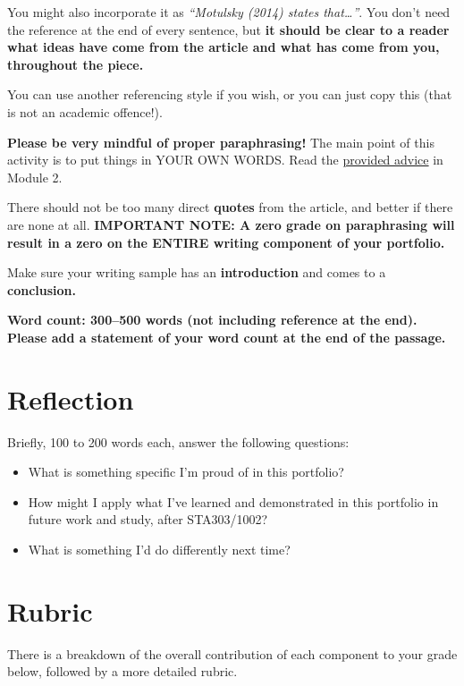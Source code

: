 \documentclass[
  openany]{book}
\begin{document}
You might also incorporate it as \emph{``Motulsky (2014) states that\ldots{}''}. You don't need the reference at the end of every sentence, but \textbf{it should be clear to a reader what ideas have come from the article and what has come from you, throughout the piece.}

You can use another referencing style if you wish, or you can just copy this (that is not an academic offence!).

\textbf{Please be very mindful of proper paraphrasing!} The main point of this activity is to put things in YOUR OWN WORDS. Read the \protect\hyperlink{paraphrasing}{provided advice} in Module 2.

There should not be too many direct \textbf{quotes} from the article, and better if there are none at all. \textbf{IMPORTANT NOTE: A zero grade on paraphrasing will result in a zero on the ENTIRE writing component of your portfolio.}

Make sure your writing sample has an \textbf{introduction} and comes to a \textbf{conclusion.}

\textbf{Word count: 300--500 words (not including reference at the end). Please add a statement of your word count at the end of the passage.}

\hypertarget{reflection-1}{%
\section{Reflection}\label{reflection-1}}

Briefly, 100 to 200 words each, answer the following questions:

\begin{itemize}
\item
  What is something specific I'm proud of in this portfolio?
\item
  How might I apply what I've learned and demonstrated in this portfolio in future work and study, after STA303/1002?
\item
  What is something I'd do differently next time?
\end{itemize}

\hypertarget{rubric-1}{%
\section{Rubric}\label{rubric-1}}

There is a breakdown of the overall contribution of each component to your grade below, followed by a more detailed rubric.
\end{document}
